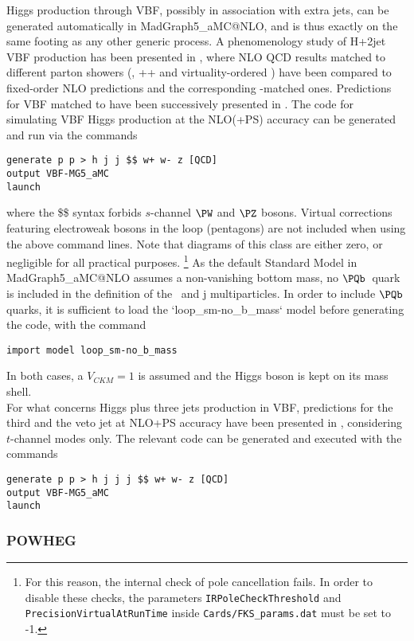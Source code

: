 Higgs production through VBF, possibly in association with extra jets,
can be generated automatically in {\sc MadGraph5\_aMC@NLO}, and is thus 
exactly on the same footing as any other generic process.
A phenomenology study of H+2jet VBF production has been presented in
, where NLO QCD results matched to different parton
showers (, \HERWIG++ and virtuality-ordered ) have been compared
to fixed-order NLO predictions and the corresponding \POWHEG-matched
ones. Predictions for VBF matched to  have been successively presented
in .  The code for simulating VBF Higgs production
at the NLO(+PS) accuracy can be generated and run via the commands
\begin{verbatim}
generate p p > h j j $$ w+ w- z [QCD]
output VBF-MG5_aMC
launch
\end{verbatim}
where the \$\$ syntax forbids $s$-channel $\PW$ and $\PZ$ bosons. 
Virtual corrections featuring electroweak bosons in the loop (pentagons) are not included when using the above command lines. Note that diagrams of this class are either zero, or negligible for all practical purposes.%
\footnote{For this reason, the internal check of pole cancellation fails. 
In order to disable these checks, the parameters \texttt{IRPoleCheckThreshold} 
and \texttt{PrecisionVirtualAtRunTime} inside \texttt{Cards/FKS\_params.dat} must be set to -1.}  
As the default
Standard Model in {\sc MadGraph5\_aMC@NLO} assumes a non-vanishing bottom mass, no
$\PQb$~quark is included in the definition of the \Pp\ and j multiparticles. In
order to include $\PQb$ quarks, it is sufficient to load the `loop\_sm-no\_b\_mass`
model before generating the code, with the command
\begin{verbatim}
import model loop_sm-no_b_mass
\end{verbatim}
In both cases, a $V_{CKM}=1$ is assumed and the Higgs boson is kept on its
mass shell.\\ 
For what concerns Higgs plus three jets production in VBF,
predictions for the third and the veto jet at NLO+PS accuracy have been
presented in , considering $t$-channel modes
only. The relevant code can be generated and executed with the commands
\begin{verbatim}
generate p p > h j j j $$ w+ w- z [QCD]
output VBF-MG5_aMC
launch
\end{verbatim}

\subsubsection{POWHEG}
\label{sec:POWHEG-sub-sub}

